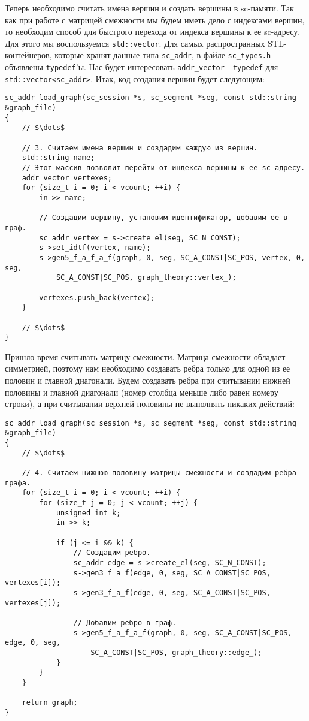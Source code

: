 Теперь необходимо считать имена вершин и создать вершины в
sc-памяти. Так как при работе с матрицей смежности мы будем иметь дело
с индексами вершин, то необходим способ для быстрого перехода от
индекса вершины к ее sc-адресу. Для этого мы воспользуемся
\lstinline|std::vector|. Для самых распространных STL-контейнеров,
которые хранят данные типа \lstinline|sc_addr|, в файле
\verb|sc_types.h| объявлены \lstinline|typedef|'ы. Нас будет
интересовать \lstinline|addr_vector| - \lstinline|typedef| для
\lstinline|std::vector<sc_addr>|. Итак, код создания вершин будет
следующим:

\begin{lstlisting}[texcl]
sc_addr load_graph(sc_session *s, sc_segment *seg, const std::string &graph_file)
{
    // $\dots$

    // 3. Считаем имена вершин и создадим каждую из вершин.
    std::string name;
    // Этот массив позволит перейти от индекса вершины к ее sc-адресу.
    addr_vector vertexes;
    for (size_t i = 0; i < vcount; ++i) {
        in >> name;

        // Создадим вершину, установим идентификатор, добавим ее в граф.
        sc_addr vertex = s->create_el(seg, SC_N_CONST);
        s->set_idtf(vertex, name);
        s->gen5_f_a_f_a_f(graph, 0, seg, SC_A_CONST|SC_POS, vertex, 0, seg,
            SC_A_CONST|SC_POS, graph_theory::vertex_);

        vertexes.push_back(vertex);
    }

    // $\dots$
}
\end{lstlisting}

Пришло время считывать матрицу смежности. Матрица смежности обладает
симметрией, поэтому нам необходимо создавать ребра только для одной из
ее половин и главной диагонали. Будем создавать ребра при считывании
нижней половины и главной диагонали (номер столбца меньше либо равен
номеру строки), а при считывании верхней половины не выполнять никаких
действий:

\begin{lstlisting}[texcl]
sc_addr load_graph(sc_session *s, sc_segment *seg, const std::string &graph_file)
{
    // $\dots$

    // 4. Считаем нижнюю половину матрицы смежности и создадим ребра графа.
    for (size_t i = 0; i < vcount; ++i) {
        for (size_t j = 0; j < vcount; ++j) {
            unsigned int k;
            in >> k;

            if (j <= i && k) {
                // Создадим ребро.
                sc_addr edge = s->create_el(seg, SC_N_CONST);
                s->gen3_f_a_f(edge, 0, seg, SC_A_CONST|SC_POS, vertexes[i]);
                s->gen3_f_a_f(edge, 0, seg, SC_A_CONST|SC_POS, vertexes[j]);

                // Добавим ребро в граф.
                s->gen5_f_a_f_a_f(graph, 0, seg, SC_A_CONST|SC_POS, edge, 0, seg,
                    SC_A_CONST|SC_POS, graph_theory::edge_);
            }
        }
    }

    return graph;
}
\end{lstlisting}

